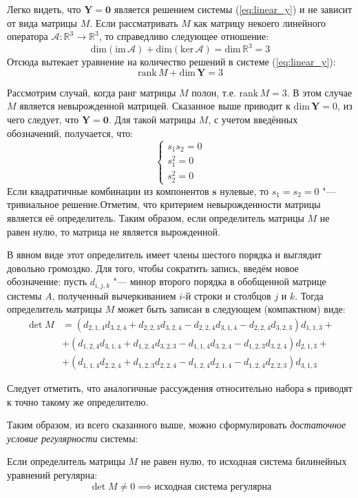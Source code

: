 Легко видеть, что $\mathbf{Y} = \mathbf{0}$ является решением системы (\ref{eq:linear_y}) и не 
зависит от вида матрицы $M$. Если рассматривать $M$ как матрицу некоего линейного оператора 
$\mathcal{A} : \mathbb{R}^3 \to \mathbb{R}^3 $, то справедливо следующее отношение:
$$
	\textrm{dim}(\textrm{im}\,\mathcal{A}) + \textrm{dim}(\textrm{ker}\,\mathcal{A}) = \textrm{dim}\,
	\mathbb{R}^3 = 3
$$
Отсюда вытекает уравнение на количество решений в системе (\ref{eq:linear_y}):
$$
	\textrm{rank}\,M + \textrm{dim}\,\mathbf{Y} = 3
$$

Рассмотрим случай, когда ранг матрицы $M$ полон, т.е. $\textrm{rank}\,M = 3$. В этом случае $M$ 
является невырожденной матрицей. Сказанное выше приводит к $\textrm{dim}\,\mathbf{Y} = 0$, из чего 
следует, что $\mathbf{Y} = \mathbf{0}$. Для такой матрицы $M$, с учетом введённых обозначений, 
получается, что: 
$$
	\begin{cases}
		s_1 s_2 = 0 \\
		s_1 ^ 2 = 0 \\
		s_2 ^ 2 = 0
	\end{cases}
$$
Если квадратичные комбинации из компонентов $\mathbf{s}$ нулевые, то $s_1 = s_2 = 0$ "--- тривиальное решение.Отметим, что критерием невырожденности матрицы является её определитель. Таким образом, если определитель матрицы $M$ не равен нулю, то матрица не является вырожденной. 

В явном виде этот определитель имеет члены шестого порядка и выглядит довольно громоздко. Для того, чтобы сократить запись, введём новое обозначение: пусть 
$d_{i, j, k}$ "--- минор второго порядка в обобщенной матрице системы $A$, полученный вычеркиванием $i$-й строки и столбцов $j$ и $k$. Тогда определитель матрицы $M$ может быть записан в следующем (компактном) виде: 
$$
	\begin{aligned}
	\det M & = (d_{2,1,4} d_{3,2,4} + d_{2,2,3} d_{3,2,4} - d_{2,2,4} d_{3,1,4} - 
		 	d_{2,2,4} d_{3,2,3}) d_{1,1,3} + \\
		 	& + (d_{1,2,4} d_{3,1,4} + d_{1,2,4} d_{3,2,3} - d_{1,1,4} d_{3,2,4} - d_{1,2,3}
		 	d_{3,2,4}) d_{2,1,3} + \\		 
		 	& + (d_{1,1,4} d_{2,2,4} + d_{1,2,3}d_{2,2,4} - d_{1,2,4}d_{2,1,4} - d_{1,2,4}
		 	d_{2,2,3}) d_{3,1,3}
	\end{aligned}
$$

Следует отметить, что аналогичные рассуждения относительно набора $\mathbf{s}$ приводят к точно такому же определителю. 

Таким образом, из всего сказанного выше, можно сформулировать \textit{достаточное условие регулярности} системы:
\begin{theorem}\label{thm:regularity}
Если определитель матрицы $M$ не равен нулю, то исходная система билинейных уравнений регулярна:
$$
\det M \ne 0 \implies\text{исходная система регулярна} 
$$
\end{theorem}

